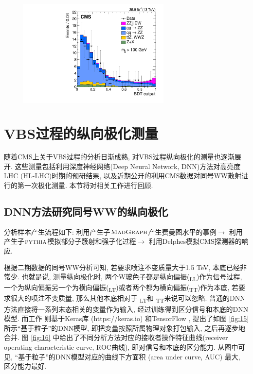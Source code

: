 \documentclass{SCIS2020cn}
\newcommand{\MADGRAPH}{\textsc{MadGraph}\xspace}
\newcommand{\PYTHIA}{{\textsc{pythia}}\xspace}
\newcommand{\Wboson}{\text{W}}
\begin{document}
\begin{figure}[ht!]
\centering
\includegraphics[width=3in]{Figure-14.pdf}
\label{fig:14}
\end{figure}

\section{VBS过程的纵向极化测量}

随着CMS上关于VBS过程的分析日渐成熟, 对VBS过程纵向极化的测量也逐渐展开. 这些测量包括利用深度神经网络(Deep Neural Network, DNN)方法对高亮度LHC (HL-LHC)时期的预研结果, 以及近期公开的利用CMS数据对同号WW散射进行的第一次极化测量. 本节将对相关工作进行回顾. 

\subsection{DNN方法研究同号WW的纵向极化}

分析样本产生流程如下: 利用产生子$\MADGRAPH$产生费曼图水平的事例$\rightarrow$ 利用产生子$\PYTHIA$模拟部分子簇射和强子化过程$\rightarrow$ 利用Delphes模拟CMS探测器的响应. 

根据二期数据的同号WW分析可知, 若要求喷注不变质量大于1.5
TeV, 本底已经非常少. 也就是说, 测量纵向极化时, 两个W玻色子都是纵向偏振(\Wboson\textsubscript{L}\Wboson\textsubscript{L})作为信号过程, 一个为纵向偏振另一个为横向偏振(\Wboson\textsubscript{L}\Wboson\textsubscript{T})或者两个都为横向偏振(\Wboson\textsubscript{T}\Wboson\textsubscript{T})作为本底, 若要求很大的喷注不变质量, 那么其他本底相对于 \Wboson\textsubscript{L}\Wboson\textsubscript{T}和 \Wboson\textsubscript{T}\Wboson\textsubscript{T}来说可以忽略. 普通的DNN方法直接将一系列末态相关的变量作为输入, 经过训练得到区分信号和本底的DNN模型. 而工作 \cite{53} 则基于Keras库 (https://keras.io) 和TensorFlow , 提出了如图 \ref{fig:15} 所示``基于粒子''的DNN模型, 即把变量按照所属物理对象打包输入, 之后再逐步地合并. 图 \ref{fig:16} 中给出了不同分析方法对应的接收者操作特征曲线(receiver operating characteristic curve, ROC曲线), 即对信号和本底的区分能力. 从图中可见, ``基于粒子''的DNN模型对应的曲线下方面积 (area under curve, AUC) 最大, 区分能力最好. 
\end{document}
